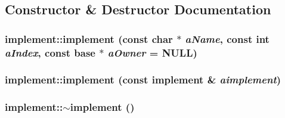 \subsection{Constructor \& Destructor Documentation}
\hypertarget{classimplement_a307449e3b4f8172c319a431fe26adad1}{
\subsubsection[{implement}]{\setlength{\rightskip}{0pt plus 5cm}implement::implement (const char $\ast$ {\em aName}, \/  const int {\em aIndex}, \/  const {\bf base} $\ast$ {\em aOwner} = {\ttfamily NULL})}}
\label{classimplement_a307449e3b4f8172c319a431fe26adad1}
\hypertarget{classimplement_af91a1884048209c13eb92489b5aa8e8d}{
\subsubsection[{implement}]{\setlength{\rightskip}{0pt plus 5cm}implement::implement (const {\bf implement} \& {\em aimplement})}}
\label{classimplement_af91a1884048209c13eb92489b5aa8e8d}
\hypertarget{classimplement_aa4cd2a78bef12f10a3f3146594e992c3}{
\subsubsection[{$\sim$implement}]{\setlength{\rightskip}{0pt plus 5cm}implement::$\sim$implement ()}}
\label{classimplement_aa4cd2a78bef12f10a3f3146594e992c3}


